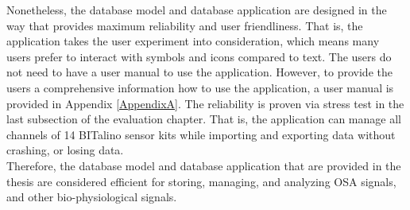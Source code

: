 Nonetheless, the database model and database application are designed in the way that provides maximum reliability and user friendliness. That is, the application takes the user experiment into consideration, which means many users prefer to interact with symbols and icons compared to text. The users do not need to have a user manual to use the application. However, to provide the users a comprehensive information how to use the application, a user manual is provided in Appendix \ref{AppendixA}. The reliability is proven via stress test in the last subsection of the evaluation chapter. That is, the application can manage all channels of 14 BITalino sensor kits while importing and exporting data without crashing, or losing data.\\
Therefore, the database model and database application that are provided in the thesis are considered efficient for storing, managing, and analyzing OSA signals, and other bio-physiological signals.
